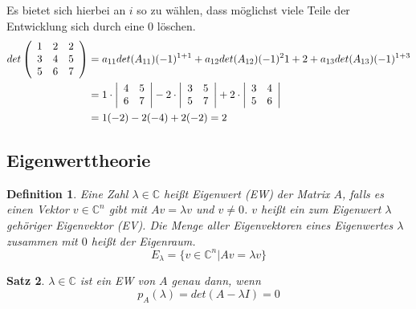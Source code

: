 \documentclass[12pt,a4paper]{article}%
\newtheorem{satz}{Satz}[section]
\newtheorem{definition}[satz]{Definition}
\numberwithin{equation}{section}
\newcommand{\C}{\mathbb{C}}
\def\mdxd#1#2#3{\left(\begin{array}{c c c} #1 \\ #2 \\ #3 \end{array}\right)}
\numberwithin{equation}{subsection}
\begin{document}
  Es bietet sich hierbei an $i$ so zu wählen, dass möglichst viele Teile der Entwicklung sich durch eine $0$ löschen.
  \begin{align*}
    det \mdxd{1 & 2 & 2}{3 & 4 & 5}{5 & 6 & 7} &= a_{11} det(A_{11}) (-1)^{1+1} + a_{12} det(A_{12})(-1)^2{1+2} + a_{13}det(A_{13})(-1)^{1+3} \\
    &= 1\cdot \left|\begin{array}{c c} 4 & 5 \\ 6 & 7 \\ \end{array}\right|
      -2 \cdot \left|\begin{array}{c c} 3 & 5 \\ 5 & 7 \\ \end{array}\right|
      + 2 \cdot \left|\begin{array}{c c} 3 & 4 \\ 5 & 6 \\ \end{array}\right|\\
    &= 1(-2)-2(-4)+2(-2) = 2
  \end{align*}
  
  \subsection{Eigenwerttheorie}
  \begin{definition}
    Eine Zahl $\lambda \in \C$ heißt Eigenwert (EW) der Matrix $A$, falls es einen Vektor $v \in \C^n$ gibt mit $Av = \lambda v$ und $v \neq 0$. $v$ heißt ein zum Eigenwert $\lambda$ gehöriger Eigenvektor (EV). Die Menge aller Eigenvektoren eines Eigenwertes $\lambda$ zusammen mit $0$ heißt der Eigenraum.
    \begin{equation}
      E_{\lambda} = \lbrace v \in \C^n | Av = \lambda v \rbrace
    \end{equation}      
  \end{definition}
  \begin{satz}
    $\lambda \in \C$ ist ein EW von $A$ genau dann, wenn
    \begin{equation}
      p_A(\lambda) = det(A-\lambda I) = 0 \label{eq:ew_charpol}
    \end{equation}
  \end{satz}
  
\end{document}
